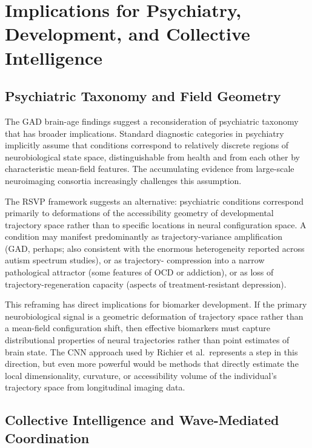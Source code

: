 \documentclass[11pt,a4paper]{article}
\theoremstyle{plain}
\theoremstyle{definition}
\begin{document}
\section{Implications for Psychiatry, Development, and Collective Intelligence}
\label{sec:implications}

\subsection{Psychiatric Taxonomy and Field Geometry}

The GAD brain-age findings suggest a reconsideration of psychiatric taxonomy that has
broader implications. Standard diagnostic categories in psychiatry implicitly assume
that conditions correspond to relatively discrete regions of neurobiological state space,
distinguishable from health and from each other by characteristic mean-field features.
The accumulating evidence from large-scale neuroimaging consortia increasingly challenges
this assumption.

The RSVP framework suggests an alternative: psychiatric conditions correspond primarily
to deformations of the accessibility geometry of developmental trajectory space rather
than to specific locations in neural configuration space. A condition may manifest
predominantly as trajectory-variance amplification (GAD, perhaps; also consistent with
the enormous heterogeneity reported across autism spectrum studies), or as trajectory-
compression into a narrow pathological attractor (some features of OCD or addiction),
or as loss of trajectory-regeneration capacity (aspects of treatment-resistant depression).

This reframing has direct implications for biomarker development. If the primary
neurobiological signal is a geometric deformation of trajectory space rather than a
mean-field configuration shift, then effective biomarkers must capture distributional
properties of neural trajectories rather than point estimates of brain state. The CNN
approach used by Richier et al.\ represents a step in this direction, but even more
powerful would be methods that directly estimate the local dimensionality, curvature,
or accessibility volume of the individual's trajectory space from longitudinal imaging data.

\subsection{Collective Intelligence and Wave-Mediated Coordination}
\end{document}
